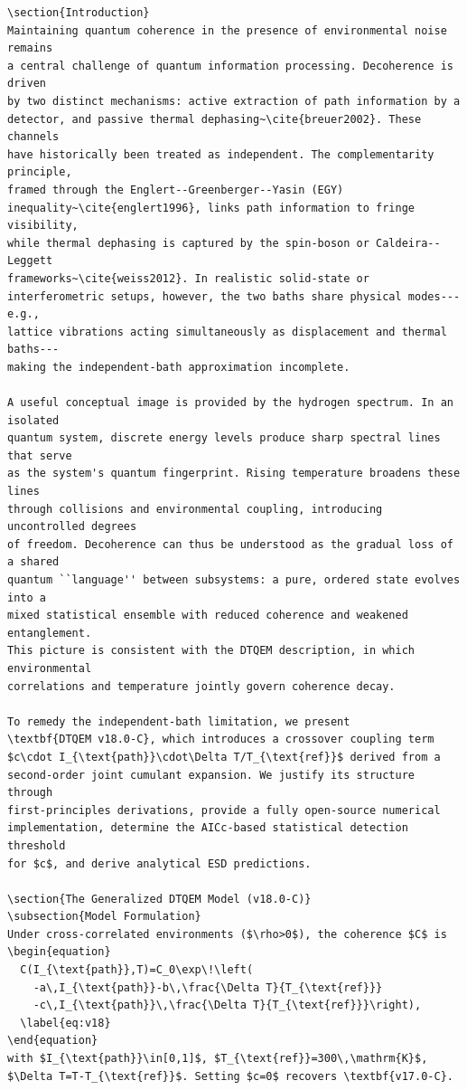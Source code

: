 \documentclass[12pt]{article}
\begin{document}
\begin{Verbatim}[fontsize=\tiny,breaklines=true]
\section{Introduction}
Maintaining quantum coherence in the presence of environmental noise remains
a central challenge of quantum information processing. Decoherence is driven
by two distinct mechanisms: active extraction of path information by a
detector, and passive thermal dephasing~\cite{breuer2002}. These channels
have historically been treated as independent. The complementarity principle,
framed through the Englert--Greenberger--Yasin (EGY)
inequality~\cite{englert1996}, links path information to fringe visibility,
while thermal dephasing is captured by the spin-boson or Caldeira--Leggett
frameworks~\cite{weiss2012}. In realistic solid-state or
interferometric setups, however, the two baths share physical modes---e.g.,
lattice vibrations acting simultaneously as displacement and thermal baths---
making the independent-bath approximation incomplete.

A useful conceptual image is provided by the hydrogen spectrum. In an isolated
quantum system, discrete energy levels produce sharp spectral lines that serve
as the system's quantum fingerprint. Rising temperature broadens these lines
through collisions and environmental coupling, introducing uncontrolled degrees
of freedom. Decoherence can thus be understood as the gradual loss of a shared
quantum ``language'' between subsystems: a pure, ordered state evolves into a
mixed statistical ensemble with reduced coherence and weakened entanglement.
This picture is consistent with the DTQEM description, in which environmental
correlations and temperature jointly govern coherence decay.

To remedy the independent-bath limitation, we present
\textbf{DTQEM v18.0-C}, which introduces a crossover coupling term
$c\cdot I_{\text{path}}\cdot\Delta T/T_{\text{ref}}$ derived from a
second-order joint cumulant expansion. We justify its structure through
first-principles derivations, provide a fully open-source numerical
implementation, determine the AICc-based statistical detection threshold
for $c$, and derive analytical ESD predictions.

\section{The Generalized DTQEM Model (v18.0-C)}
\subsection{Model Formulation}
Under cross-correlated environments ($\rho>0$), the coherence $C$ is
\begin{equation}
  C(I_{\text{path}},T)=C_0\exp\!\left(
    -a\,I_{\text{path}}-b\,\frac{\Delta T}{T_{\text{ref}}}
    -c\,I_{\text{path}}\,\frac{\Delta T}{T_{\text{ref}}}\right),
  \label{eq:v18}
\end{equation}
with $I_{\text{path}}\in[0,1]$, $T_{\text{ref}}=300\,\mathrm{K}$,
$\Delta T=T-T_{\text{ref}}$. Setting $c=0$ recovers \textbf{v17.0-C}.


\end{Verbatim}
\end{document}
